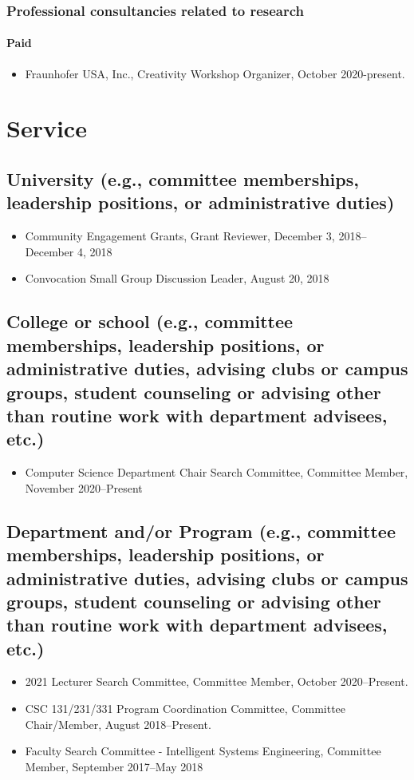 \documentclass[10pt]{article}
\begin{document}
\subsubsection{Professional consultancies related to research}
\paragraph{Paid}
\begin{itemize}
    \item Fraunhofer USA, Inc., Creativity Workshop Organizer, October 2020-present.
\end{itemize}

\newpage
\section{Service}
\subsection{University (e.g., committee memberships, leadership positions, or administrative duties)}
\begin{itemize}
    \item Community Engagement Grants, Grant Reviewer, December 3, 2018--December 4, 2018
    \item Convocation Small Group Discussion Leader, August 20, 2018
\end{itemize}

\subsection{College or school (e.g., committee memberships, leadership positions, or administrative duties, advising clubs or campus groups, student counseling or advising other than routine work with department advisees, etc.)}
\begin{itemize}
    \item Computer Science Department Chair Search Committee, Committee Member, November 2020--Present 
\end{itemize}

\subsection{Department and/or Program (e.g., committee memberships, leadership positions, or administrative duties, advising clubs or campus groups, student counseling or advising other than routine work with department advisees, etc.)}
\begin{itemize}
    \item 2021 Lecturer Search Committee, Committee Member, October 2020--Present.
    \item CSC 131/231/331 Program Coordination Committee, Committee Chair/Member, August 2018--Present. 
    \item Faculty Search Committee - Intelligent Systems Engineering, Committee Member, September 2017--May 2018
\end{itemize}
\end{document}
